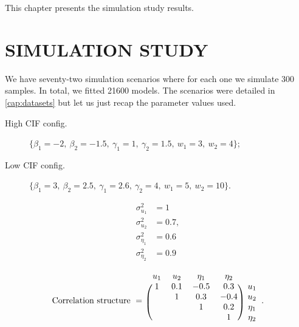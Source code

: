 This chapter presents the simulation study results.

\section{SIMULATION STUDY}
\label{cap:simures}

We have seventy-two simulation scenarios where for each one we simulate
300 samples. In total, we fitted 21600 models. The scenarios were
detailed in \autoref{cap:datasets} but let us just recap the parameter
values used.
\begin{description}
 \item[High CIF config.] \(\{\beta_{1} = -2,~\beta_{2} = -1.5,~
                             \gamma_{1} = 1,~\gamma_{2} = 1.5,~
                             w_{1} = 3,~w_{2} = 4\}\);
 \item[Low CIF config.] \(\{\beta_{1} = 3,~\beta_{2} = 2.5,~
                            \gamma_{1} = 2.6,~\gamma_{2} = 4,~
                            w_{1} = 5,~w_{2} = 10\}\).
\end{description}
\begin{minipage}{0.1\textwidth}
 \begin{align*}
  \sigma_{u_{1}}^{2}   &= 1\\
  \sigma_{u_{2}}^{2}   &= 0.7,\\
  \sigma_{\eta_{1}}^{2} &= 0.6\\
  \sigma_{\eta_{2}}^{2} &= 0.9
 \end{align*}
\end{minipage}%
\begin{minipage}{0.9\textwidth}
 \[
  \text{Correlation structure}~=~\begin{blockarray}{ccccc}
                                  u_{1} & u_{2} & \eta_{1} & \eta_{2}\\
                                  \begin{block}{(cccc)c}
                                   1 & 0.1 & -0.5 &  0.3 & u_{1}\\
                                     &   1 &  0.3 & -0.4 & u_{2}\\
                                     &     &    1 &  0.2 & \eta_{1}\\
                                     &     &      &    1 & \eta_{2}\\
                                  \end{block}
                                 \end{blockarray}.
 \]
\end{minipage}

